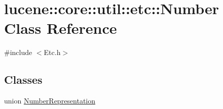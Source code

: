 \hypertarget{classlucene_1_1core_1_1util_1_1etc_1_1Number}{}\section{lucene\+:\+:core\+:\+:util\+:\+:etc\+:\+:Number Class Reference}
\label{classlucene_1_1core_1_1util_1_1etc_1_1Number}


{\ttfamily \#include $<$Etc.\+h$>$}

\subsection*{Classes}
\begin{DoxyCompactItemize}
\item 
union \mbox{\hyperlink{unionlucene_1_1core_1_1util_1_1etc_1_1Number_1_1NumberRepresentation}{Number\+Representation}}
\end{DoxyCompactItemize}
